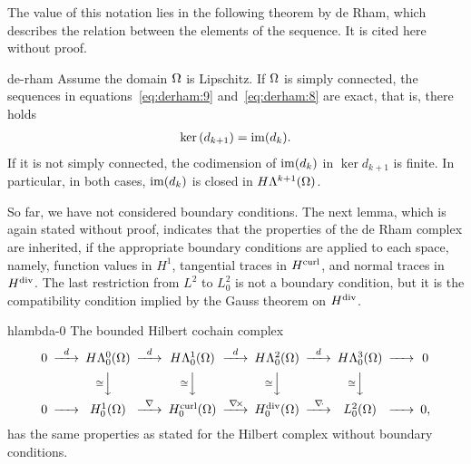 The value of this notation lies in the following theorem by de Rham,
which describes the relation between the elements of the sequence. It
is cited here without proof.

\begin{Theorem}{de-rham}
  Assume the domain $\Omega$ is Lipschitz.  If $\Omega$ is simply
  connected, the sequences in equations~\eqref{eq:derham:9}
  and~\eqref{eq:derham:8} are exact, that is, there holds
  \begin{gather}
    \label{eq:derham:7}
    \operatorname{ker}\left(d_{k+1}\right) = \operatorname{im}(d_k).
  \end{gather}
  If it is not simply connected, the codimension of $\operatorname{im}(d_k)$ in
  $\ker{d_{k+1}}$ is finite. In particular, in both cases,
  $\operatorname{im}(d_k)$ is closed in $H\Lambda^{k+1}(\Omega)$.
\end{Theorem}

So far, we have not considered boundary conditions. The next lemma,
which is again stated without proof, indicates that the properties of
the de Rham complex are inherited, if the appropriate boundary
conditions are applied to each space, namely, function values in
$H^1$, tangential traces in $H^{\text{curl}}$, and normal traces in
$H^{\text{div}}$. The last restriction from $L^2$ to $L^2_0$ is not a boundary
condition, but it is the compatibility condition implied by the Gauss
theorem on $H^{\text{div}}$.

\begin{Lemma}{hlambda-0}
  The bounded Hilbert cochain complex
  \begin{gather}\minCDarrowwidth20pt
    \begin{CD}
      0
      @>{d}>> H\Lambda^0_0(\domain)
      @>{d}>> H\Lambda^1_0(\domain)
      @>{d}>> H\Lambda^2_0(\domain)
      @>{d}>> H\Lambda^3_0(\domain)
      @>>> 0
      \\
      @.
      @V{\cong}VV
      @V{\cong}VV
      @V{\cong}VV
      @V{\cong}VV
      \\
      0
      @>>> H^1_0(\domain)
      @>{\nabla}>> \Hcurl_0(\domain)
      @>{\curl}>> \Hdiv_0(\domain)
      @>{\div}>> L^2_0(\domain)
      @>>> 0,
    \end{CD}
  \end{gather}
  has the same properties as stated for the Hilbert complex without
  boundary conditions.
\end{Lemma}



